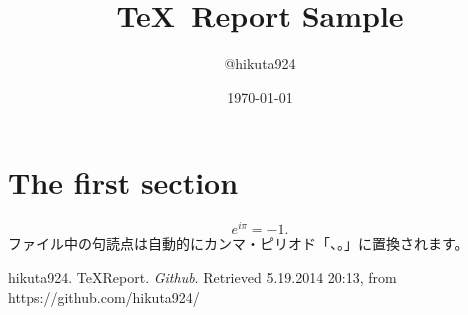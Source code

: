 
\title{\TeX\ Report Sample}
\author{@hikuta924}
\date{\today}

\maketitle

\section{The first section}
\begin{equation}
	e^{i \pi} = -1.
\end{equation}
ファイル中の句読点は自動的にカンマ・ピリオド「、。」に置換されます。



\begin{thebibliography}{AAA999}
     hikuta924. TeXReport. {\em Github}. Retrieved 5.19.2014 20:13, from https://github.com/hikuta924/
\end{thebibliography}

